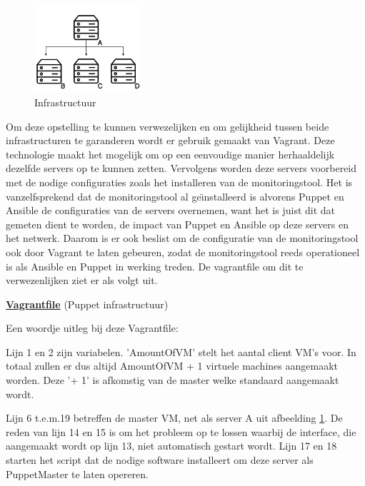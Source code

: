 \begin{figure}
  \begin{center}
\includegraphics[width=150px]{img/infrastructruur.png}
\end{center}  \caption{Infrastructuur}
  \label{fig:infrastructuur}
\end{figure}

Om deze opstelling te kunnen verwezelijken en om gelijkheid tussen beide infrastructuren te garanderen wordt er gebruik gemaakt van Vagrant. Deze technologie maakt het mogelijk om op een eenvoudige manier herhaaldelijk dezelfde servers op te kunnen zetten. Vervolgens worden deze servers voorbereid met de nodige configuraties zoals het installeren van de monitoringstool. Het is vanzelfsprekend dat de monitoringstool al ge{\"\i}nstalleerd is alvorens Puppet en Ansible de configuraties van de servers overnemen, want het is juist dit dat gemeten dient te worden, de impact van Puppet en Ansible op deze servers en het netwerk. Daarom is er ook beslist om de configuratie van de monitoringstool ook door Vagrant te laten gebeuren, zodat de monitoringstool reeds operationeel is als Ansible en Puppet in werking treden. De vagrantfile om dit te verwezenlijken ziet er als volgt uit.


\underline{\textbf{Vagrantfile}} (Puppet infrastructuur)


Een woordje uitleg bij deze Vagrantfile:

Lijn 1 en 2 zijn variabelen. 'AmountOfVM' stelt het aantal client VM's voor. In totaal zullen er dus altijd AmountOfVM + 1 virtuele machines aangemaakt worden. Deze '+ 1' is afkomstig van de master welke standaard aangemaakt wordt.

Lijn 6 t.e.m.19 betreffen de master VM, net als server A uit afbeelding  \ref{fig:infrastructuur}.
De reden van lijn 14 en 15 is om het probleem op te lossen waarbij de interface, die aangemaakt wordt op lijn 13, niet automatisch gestart wordt. 
Lijn 17 en 18 starten het script dat de nodige software installeert om deze server als PuppetMaster te laten opereren.

